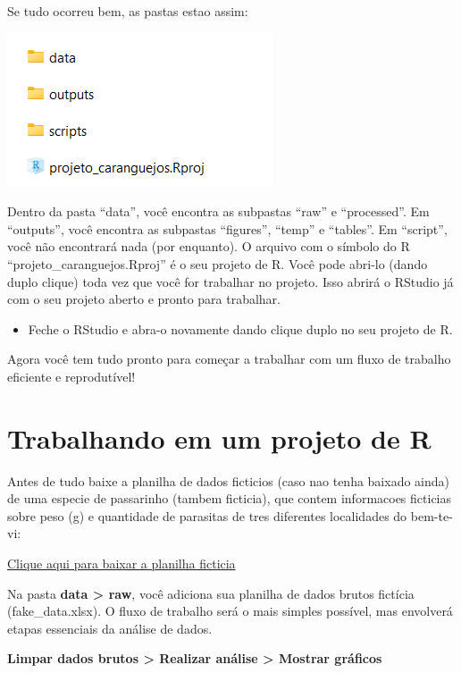 \documentclass[
]{book}
\providecommand{\tightlist}{%
  \setlength{\itemsep}{0pt}\setlength{\parskip}{0pt}}
\begin{document}
Se tudo ocorreu bem, as pastas estao assim:

\includegraphics{img/pastas_do_projeto.png}

Dentro da pasta ``data'', você encontra as subpastas ``raw'' e ``processed''. Em ``outputs'', você encontra as subpastas ``figures'', ``temp'' e ``tables''. Em ``script'', você não encontrará nada (por enquanto). O arquivo com o símbolo do R ``projeto\_caranguejos.Rproj'' é o seu projeto de R. Você pode abri-lo (dando duplo clique) toda vez que você for trabalhar no projeto. Isso abrirá o RStudio já com o seu projeto aberto e pronto para trabalhar.

\begin{itemize}
\tightlist
\item
  Feche o RStudio e abra-o novamente dando clique duplo no seu projeto de R.
\end{itemize}

Agora você tem tudo pronto para começar a trabalhar com um fluxo de trabalho eficiente e reprodutível!

\hypertarget{trabalhando-em-um-projeto-de-r}{%
\section{Trabalhando em um projeto de R}\label{trabalhando-em-um-projeto-de-r}}

Antes de tudo baixe a planilha de dados ficticios (caso nao tenha baixado ainda) de uma especie de passarinho (tambem ficticia), que contem informacoes ficticias sobre peso (g) e quantidade de parasitas de tres diferentes localidades do bem-te-vi:

\href{data/fake_data.xlsx}{Clique aqui para baixar a planilha ficticia}

Na pasta \textbf{data \textgreater{} raw}, você adiciona sua planilha de dados brutos fictícia (fake\_data.xlsx). O fluxo de trabalho será o mais simples possível, mas envolverá etapas essenciais da análise de dados.

\textbf{Limpar dados brutos \textgreater{} Realizar análise \textgreater{} Mostrar gráficos}
\end{document}
